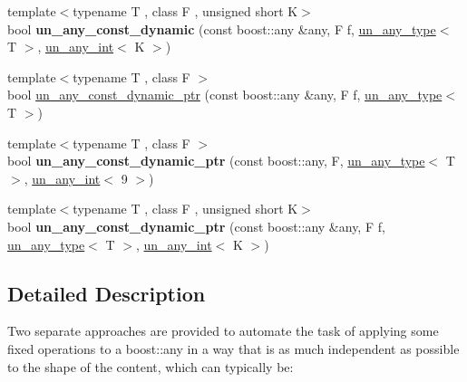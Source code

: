 \begin{DoxyCompactItemize}
{\footnotesize template$<$typename T , class F , unsigned short K$>$ }\\bool {\bfseries un\+\_\+any\+\_\+const\+\_\+dynamic} (const boost\+::any \&any, F f, \mbox{\hyperlink{struct_s_m_spp__di__unipi__it_1_1un__any__type}{un\+\_\+any\+\_\+type}}$<$ T $>$, \mbox{\hyperlink{struct_s_m_spp__di__unipi__it_1_1un__any__int}{un\+\_\+any\+\_\+int}}$<$ K $>$)
\item 
{\footnotesize template$<$typename T , class F $>$ }\\bool \mbox{\hyperlink{group__boost__any__stuff_ga5497c469090a3757a1e45ec10a290289}{un\+\_\+any\+\_\+const\+\_\+dynamic\+\_\+ptr}} (const boost\+::any \&any, F f, \mbox{\hyperlink{struct_s_m_spp__di__unipi__it_1_1un__any__type}{un\+\_\+any\+\_\+type}}$<$ T $>$)
\item 
\mbox{\label{group__boost__any__stuff_ga84c612c779165986b6974c640245864f}} 
{\footnotesize template$<$typename T , class F $>$ }\\bool {\bfseries un\+\_\+any\+\_\+const\+\_\+dynamic\+\_\+ptr} (const boost\+::any, F, \mbox{\hyperlink{struct_s_m_spp__di__unipi__it_1_1un__any__type}{un\+\_\+any\+\_\+type}}$<$ T $>$, \mbox{\hyperlink{struct_s_m_spp__di__unipi__it_1_1un__any__int}{un\+\_\+any\+\_\+int}}$<$ 9 $>$)
\item 
\mbox{\label{group__boost__any__stuff_gaf48212aacae8d68cf2d0750cd2b9ab91}} 
{\footnotesize template$<$typename T , class F , unsigned short K$>$ }\\bool {\bfseries un\+\_\+any\+\_\+const\+\_\+dynamic\+\_\+ptr} (const boost\+::any \&any, F f, \mbox{\hyperlink{struct_s_m_spp__di__unipi__it_1_1un__any__type}{un\+\_\+any\+\_\+type}}$<$ T $>$, \mbox{\hyperlink{struct_s_m_spp__di__unipi__it_1_1un__any__int}{un\+\_\+any\+\_\+int}}$<$ K $>$)
\end{DoxyCompactItemize}


\subsection{Detailed Description}
Two separate approaches are provided to automate the task of applying some fixed operations to a boost\+::any in a way that is as much independent as possible to the shape of the content, which can typically be\+:


